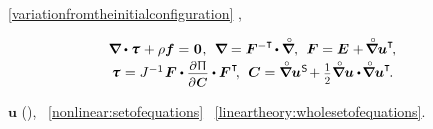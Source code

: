 ~\eqref{variationfromtheinitialconfiguration}
,

\nopagebreak\vspace{-0.25em}
\begin{equation}\label{nonlinear:setofequations}
\begin{array}{c}
\boldnabla \dotp \cauchystress \hspace{.15ex} + \massdensity \massloadvector = \hspace{.1ex} \zerovector \hspace{.1ex},
\:\:
\boldnabla = \bm{F}^{-\T} \hspace{-0.2ex} \dotp \boldnablacircled ,
\:\:
\bm{F} = \UnitDyad \hspace{.1ex} + \hspace{-0.2ex} \boldnablacircled {\bm{u}}^{\T} \hspace{-0.3ex},
\\[.2em]
%
\cauchystress \hspace{.1ex} = J^{-1} \hspace{.2ex} \bm{F} \dotp \scalebox{0.9}{$ \displaystyle \frac{\raisemath{-0.125em}{\partial\hspace{.1ex} \potentialenergydensity}}{\raisemath{-0.1em}{\partial\hspace{.1ex} \bm{C}}} $} \dotp \bm{F}^{\hspace{.1ex}\T} \hspace{-0.4ex},
\:\:
\bm{C} = \boldnablacircled {\bm{u}}^{\hspace{.1ex}\mathsf{S}} \hspace{-0.3ex} + \smalldisplaystyleonehalf \boldnablacircled \bm{u} \dotp \hspace{-0.25ex} \boldnablacircled \bm{u}^{\T} \hspace{-0.25ex}.
\end{array}
\end{equation}

\vspace{-0.1em}\noindent
{}
~$\bm{u}$
(),
~\eqref{nonlinear:setofequations}
~\eqref{lineartheory:wholesetofequations}.

